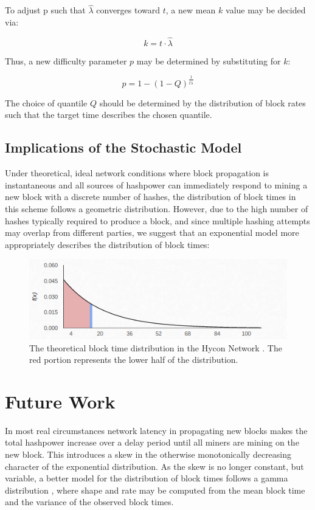 \documentclass[]{article}
\begin{document}
To adjust p such that $\hat{\lambda}$ converges toward $t$, a new mean $k$ value may be decided via:

\begin{equation}
	k = t \cdot \hat{\lambda}
\end{equation} 

Thus, a new difficulty parameter $p$ may be determined by substituting for $k$: 

\begin{equation}
p = 1 - (1 - Q)^\frac{1}{t \hat{\lambda}} 
\end{equation}

The choice of quantile $Q$ should be determined by the distribution of block rates such that the target time describes the chosen quantile. 

\subsection{Implications of the Stochastic Model}  
Under theoretical, ideal network conditions where block propagation is instantaneous and all sources of hashpower can immediately respond to mining a new block with a discrete number of hashes, the distribution of block times in this scheme follows a geometric distribution.  However, due to the high number of hashes typically required to produce a block, and since multiple hashing attempts may overlap from different parties, we suggest that an exponential model more appropriately describes the distribution of block times: 

\begin{figure}[h]
	\centering
	\includegraphics[width=0.7\linewidth]{"./ideal hycon"}
	\caption{\footnotesize The theoretical block time distribution in the Hycon Network \cite{HyconNetwork}. The red portion represents the lower half of the distribution. \cite{GammaDistHycon}}
\end{figure}

\section{Future Work}
In most real circumstances network latency in propagating new blocks makes the total hashpower increase over a delay period until all miners are mining on the new block.  This introduces a skew in the otherwise monotonically decreasing character of the exponential distribution.  As the skew is no longer constant, but variable, a better model for the distribution of block times follows a gamma distribution \cite{GammaDistDefinition}, where shape and rate may be computed from the mean block time and the variance of the observed block times.  
\end{document}
